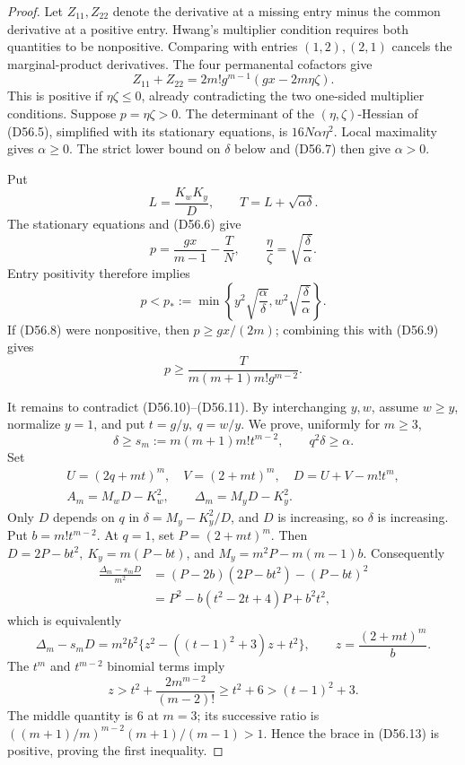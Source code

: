 \documentclass[11pt]{amsart}
\theoremstyle{definition}
\theoremstyle{remark}
\begin{document}
\begin{proof}
Let \(Z_{11},Z_{22}\) denote the derivative at a missing entry minus the
common derivative at a positive entry. Hwang's multiplier condition
\cite[Lemma 3.6]{CW} requires both quantities to be nonpositive. Comparing
with entries \((1,2),(2,1)\) cancels the marginal-product derivatives. The four
permanental cofactors give
\[
Z_{11}+Z_{22}
=2m!g^{m-1}(gx-2m\eta\zeta).                       \tag{D56.8}
\]
This is positive if \(\eta\zeta\leq0\), already contradicting the two
one-sided multiplier conditions. Suppose \(p=\eta\zeta>0\). The determinant
of the \((\eta,\zeta)\)-Hessian of (D56.5), simplified with its stationary
equations, is \(16N\alpha\eta^2\). Local maximality gives \(\alpha\geq0\).
The strict lower bound on \(\delta\) below and (D56.7) then give
\(\alpha>0\).

Put
\[
L=\frac{K_wK_y}{D},\qquad T=L+\sqrt{\alpha\delta}.
\]
The stationary equations and (D56.6) give
\[
p=\frac{gx}{m-1}-\frac{T}{N},\qquad
\frac{\eta}{\zeta}=\sqrt{\frac{\delta}{\alpha}}.   \tag{D56.9}
\]
Entry positivity therefore implies
\[
p<p_*:=\min\left\{
y^2\sqrt{\frac{\alpha}{\delta}},
w^2\sqrt{\frac{\delta}{\alpha}}\right\}.           \tag{D56.10}
\]
If (D56.8) were nonpositive, then \(p\geq gx/(2m)\);
combining this with (D56.9) gives
\[
p\geq\frac{T}{m(m+1)m!g^{m-2}}.                   \tag{D56.11}
\]

It remains to contradict (D56.10)--(D56.11). By interchanging \(y,w\),
assume \(w\geq y\), normalize \(y=1\), and put
\(t=g/y,\ q=w/y\). We prove, uniformly for \(m\geq3\),
\[
\delta\geq s_m:=m(m+1)m!t^{m-2},\qquad
q^2\delta\geq\alpha.                               \tag{D56.12}
\]
Set
\[
\begin{gathered}
U=(2q+mt)^m,\quad V=(2+mt)^m,\quad D=U+V-m!t^m,\\
A_m=M_wD-K_w^2,\qquad \Delta_m=M_yD-K_y^2.
\end{gathered}
\]
Only \(D\) depends on \(q\) in
\(\delta=M_y-K_y^2/D\), and \(D\) is increasing, so \(\delta\) is
increasing. Put \(b=m!t^{m-2}\). At \(q=1\), set \(P=(2+mt)^m\).
Then \(D=2P-bt^2,\ K_y=m(P-bt)\), and
\(M_y=m^2P-m(m-1)b\). Consequently
\[
\begin{split}
\frac{\Delta_m-s_mD}{m^2}
&=(P-2b)(2P-bt^2)-(P-bt)^2\\
&=P^2-b(t^2-2t+4)P+b^2t^2,
\end{split}
\]
which is equivalently
\[
\Delta_m-s_mD
=m^2b^2\{z^2-((t-1)^2+3)z+t^2\},\qquad
z=\frac{(2+mt)^m}{b}.                              \tag{D56.13}
\]
The \(t^m\) and \(t^{m-2}\) binomial terms imply
\[
z>t^2+\frac{2m^{m-2}}{(m-2)!}\geq t^2+6
>(t-1)^2+3.
\]
The middle quantity is \(6\) at \(m=3\); its successive ratio is
\(((m+1)/m)^{m-2}(m+1)/(m-1)>1\). Hence
the brace in (D56.13) is positive, proving the first inequality.


\end{proof}
\end{document}
